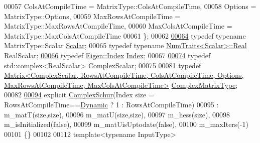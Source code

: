 \begin{DoxyCode}
00057       ColsAtCompileTime = MatrixType::ColsAtCompileTime,
00058       Options = MatrixType::Options,
00059       MaxRowsAtCompileTime = MatrixType::MaxRowsAtCompileTime,
00060       MaxColsAtCompileTime = MatrixType::MaxColsAtCompileTime
00061     \};
00062 
\hyperlink{group___eigenvalues___module_a9a8ee9df37ee1f90d0e53103c58683c0}{00064}     \textcolor{keyword}{typedef} \textcolor{keyword}{typename} MatrixType::Scalar \hyperlink{group___eigenvalues___module_a9a8ee9df37ee1f90d0e53103c58683c0}{Scalar};
00065     \textcolor{keyword}{typedef} \textcolor{keyword}{typename} \hyperlink{group___core___module_struct_eigen_1_1_num_traits}{NumTraits<Scalar>::Real} RealScalar;
\hyperlink{group___eigenvalues___module_a652104d13723a5b1db2937866a034557}{00066}     \textcolor{keyword}{typedef} \hyperlink{namespace_eigen_a62e77e0933482dafde8fe197d9a2cfde}{Eigen::Index} \hyperlink{group___eigenvalues___module_a652104d13723a5b1db2937866a034557}{Index}; 
00067 
\hyperlink{group___eigenvalues___module_ae1a4713b53f821867fbad617e426832a}{00074}     \textcolor{keyword}{typedef} std::complex<RealScalar> \hyperlink{group___eigenvalues___module_ae1a4713b53f821867fbad617e426832a}{ComplexScalar};
00075 
\hyperlink{group___eigenvalues___module_af61fe57877d51cfb50178f78534042f0}{00081}     \textcolor{keyword}{typedef} 
      \hyperlink{group___core___module}{Matrix<ComplexScalar, RowsAtCompileTime, ColsAtCompileTime, Options, MaxRowsAtCompileTime,
       MaxColsAtCompileTime>}
       \hyperlink{group___eigenvalues___module_af61fe57877d51cfb50178f78534042f0}{ComplexMatrixType};
00082 
\hyperlink{group___eigenvalues___module_ad707d9978dc36b3b15e460c2a83f4093}{00094}     \textcolor{keyword}{explicit} \hyperlink{group___eigenvalues___module_ad707d9978dc36b3b15e460c2a83f4093}{ComplexSchur}(Index size = RowsAtCompileTime==\hyperlink{namespace_eigen_ad81fa7195215a0ce30017dfac309f0b2}{Dynamic} ? 1 : 
      RowsAtCompileTime)
00095       : m\_matT(size,size),
00096         m\_matU(size,size),
00097         m\_hess(size),
00098         m\_isInitialized(false),
00099         m\_matUisUptodate(false),
00100         m\_maxIters(-1)
00101     \{\}
00102 
00112     \textcolor{keyword}{template}<\textcolor{keyword}{typename} InputType>

\end{DoxyCode}
